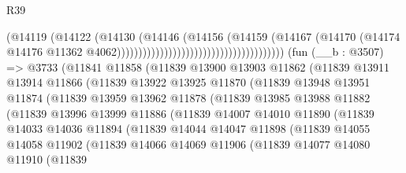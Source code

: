 \begin{lexlean}{R39}
\begin{coremodule}
                                                                (@14119
                                                                  (@14122
                                                                    (@14130
                                                                      (@14146
                                                                        (@14156
                                                                          (@14159
                                                                            (@14167
                                                                              (@14170
                                                                                (@14174
                                                                                  @14176
                                                                                  @11362
                                                                                  @4062)))))))))))))))))))))))))))))))))))))))
    (fun (__b : @3507) =>
    @3733
      (@11841
        @11858
        (@11839
          @13900
          @13903
          @11862
          (@11839
            @13911
            @13914
            @11866
            (@11839
              @13922
              @13925
              @11870
              (@11839
                @13948
                @13951
                @11874
                (@11839
                  @13959
                  @13962
                  @11878
                  (@11839
                    @13985
                    @13988
                    @11882
                    (@11839
                      @13996
                      @13999
                      @11886
                      (@11839
                        @14007
                        @14010
                        @11890
                        (@11839
                          @14033
                          @14036
                          @11894
                          (@11839
                            @14044
                            @14047
                            @11898
                            (@11839
                              @14055
                              @14058
                              @11902
                              (@11839
                                @14066
                                @14069
                                @11906
                                (@11839
                                  @14077
                                  @14080
                                  @11910
                                  (@11839

\end{coremodule}
\end{lexlean}
